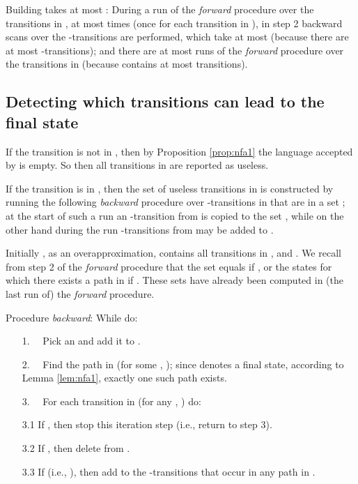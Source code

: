 \documentclass{llncs}
\begin{document}
Building  takes at most : During a run of the {\em forward} procedure over the transitions in ,
at most  times (once for each transition in ), in step 2 backward scans over the -transitions are performed,
which take at most  (because there are at most  -transitions);
and there are at most  runs of the {\em forward} procedure over the transitions in  (because  contains at most  transitions).


\subsection{Detecting which transitions can lead to the final state}
\label{sec:backward}

If the transition  is not in , then by Proposition \ref{prop:nfa1} the language accepted by 
is empty. So then all transitions in  are reported as useless.

If the transition  is in , then
the set  of useless transitions in  is constructed by running the following {\em backward} procedure
over -transitions in  that are in a set ; at the start of such a run an -transition from  is
copied to the set , while on the other hand during the run -transitions from  may be added to .

Initially , as an overapproximation, contains all transitions in , 
and . We recall from step 2 of the {\em forward} procedure that the set  equals  if ,
or the states  for which there exists a path  in  if .
These sets have already been computed in (the last run of) the {\em forward} procedure.

\vspace{4mm}

\noindent
Procedure {\em backward}: While  do:
\begin{enumerate}
\item[1.~~]
Pick an  and add it to .\vspace{1mm}
\item[2.~~]
Find the path  in  (for some , ); since  denotes a final state, according to Lemma \ref{lem:nfa1}, exactly one such path exists.\vspace{1mm}
\item[3.~~]
For each transition  in  (for any , ) do:\vspace{1mm}
\item[3.1]
If , then stop this iteration step (i.e., return to step 3).\vspace{1mm}
\item[3.2]
If , then delete  from .\vspace{1mm}
\item[3.3]
If  (i.e., ), then add to  the -transitions that occur in any path
 in .
\end{enumerate}
\end{document}
